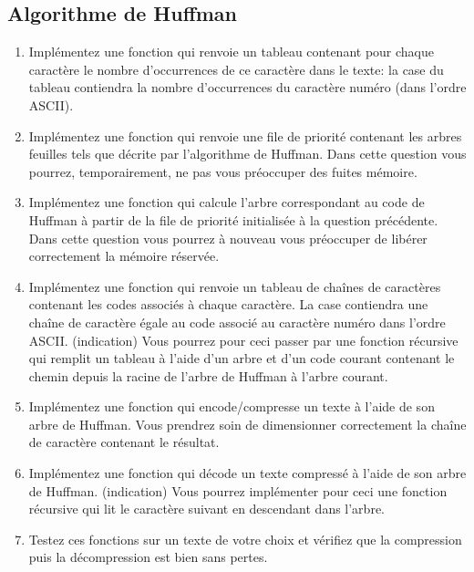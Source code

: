\documentclass[a4paper, 10pt]{article}
\begin{document}
\subsection{Algorithme de Huffman}
\begin{enumerate}[resume]
\item Implémentez une fonction  qui renvoie un tableau contenant pour chaque caractère le nombre d'occurrences de ce caractère dans le texte: la case  du tableau contiendra la nombre d'occurrences du caractère numéro  (dans l'ordre ASCII).
\item Implémentez une fonction  qui renvoie une file de priorité contenant les arbres feuilles tels que décrite par l'algorithme de Huffman. Dans cette question vous pourrez, temporairement, ne pas vous préoccuper des fuites mémoire.
\item Implémentez une fonction  qui calcule l'arbre correspondant au code de Huffman à partir de la file de priorité initialisée à la question précédente. Dans cette question vous pourrez à nouveau vous préoccuper de libérer correctement la mémoire réservée.
\item Implémentez une fonction  qui renvoie un tableau de chaînes de caractères contenant les codes associés à chaque caractère. La case  contiendra une chaîne de caractère égale au code associé au caractère numéro  dans l'ordre ASCII. (indication) Vous pourrez pour ceci passer par une fonction récursive qui remplit un tableau à l'aide d'un arbre et d'un code courant contenant le chemin depuis la racine de l'arbre de Huffman à l'arbre courant.
\item Implémentez une fonction  qui encode/compresse un texte à l'aide de son arbre de Huffman. Vous prendrez soin de dimensionner correctement la chaîne de caractère contenant le résultat.
\item Implémentez une fonction  qui décode un texte compressé à l'aide de son arbre de Huffman. (indication) Vous pourrez implémenter pour ceci une fonction récursive qui lit le caractère suivant en descendant dans l'arbre.
\item Testez ces fonctions sur un texte de votre choix et vérifiez que la compression puis la décompression est bien sans pertes.
\end{enumerate}
\end{document}
